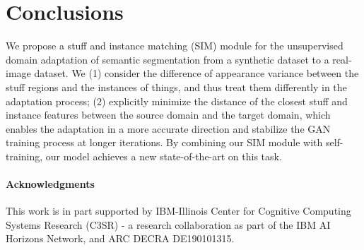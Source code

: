 \documentclass[10pt,twocolumn,letterpaper]{article}
\begin{document}
\section{Conclusions}
\vspace{-1mm}
We propose a stuff and instance matching (SIM) module for the unsupervised domain adaptation of semantic segmentation from a synthetic dataset to a real-image dataset. We (1) consider the difference of appearance variance between the stuff regions and the instances of things, and thus treat them differently in the adaptation process; (2) explicitly minimize the distance of the closest stuff and instance features between the source domain and the target domain, which enables the adaptation in a more accurate direction and stabilize the GAN training process at longer iterations. By combining our SIM module with self-training, our model achieves a new state-of-the-art on this task. 
\vspace{-2mm}

\paragraph{Acknowledgments}
This work is in part supported by IBM-Illinois Center for Cognitive Computing Systems Research (C3SR) - a research collaboration as part of the IBM AI Horizons Network, and ARC DECRA DE190101315.

{\small


}
\end{document}
